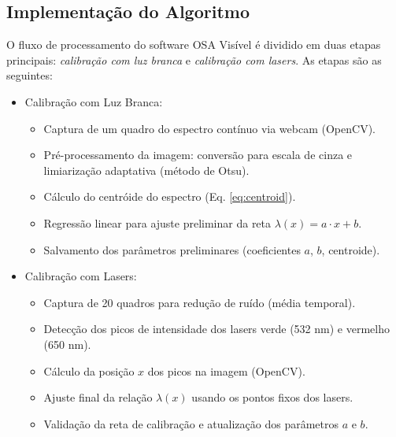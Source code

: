 \documentclass[a4paper]{ifacconf}
\begin{document}
\subsection{Implementação do Algoritmo}
O fluxo de processamento do software OSA Visível é dividido em duas etapas principais: \textit{calibração com luz branca} e \textit{calibração com lasers}. As etapas são as seguintes:

\begin{itemize}
    \item Calibração com Luz Branca:
    \begin{itemize}
        \item Captura de um quadro do espectro contínuo via webcam (OpenCV).
        \item Pré-processamento da imagem: conversão para escala de cinza e limiarização adaptativa (método de Otsu).
        \item Cálculo do centróide do espectro (Eq. \ref{eq:centroid}).
        \item Regressão linear para ajuste preliminar da reta \(\lambda(x) = a \cdot x + b\).
        \item Salvamento dos parâmetros preliminares (coeficientes \(a\), \(b\), centroide).
    \end{itemize}
    
    \item Calibração com Lasers:
    \begin{itemize}
        \item Captura de 20 quadros para redução de ruído (média temporal).
        \item Detecção dos picos de intensidade dos lasers verde (532 nm) e vermelho (650 nm).
        \item Cálculo da posição \(x\) dos picos na imagem (OpenCV).
        \item Ajuste final da relação \(\lambda(x)\) usando os pontos fixos dos lasers.
        \item Validação da reta de calibração e atualização dos parâmetros \(a\) e \(b\).
    \end{itemize}
\end{itemize}

\end{document}
